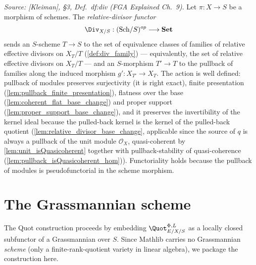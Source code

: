 \begin{definition}
  \label{def:div_functor}
  \textit{Source: [Kleiman], \S 3, Def.~df:div (FGA Explained Ch.~9).}
  Let \(\pi : X \to S\) be a morphism of schemes.  The
  \emph{relative-divisor functor}
  \[
    \Div_{X/S} : (\mathrm{Sch}/S)^{op} \longrightarrow \mathbf{Set}
  \]
  sends an \(S\)-scheme \(T \to S\) to the set of equivalence classes of
  families of relative effective divisors on \(X_T/T\)
  (\cref{def:div_family}) --- equivalently, the set of relative effective
  divisors on \(X_T/T\) --- and an \(S\)-morphism \(T' \to T\) to the
  pullback of families along the induced morphism
  \(g' : X_{T'} \to X_T\).  The action is well defined: pullback of modules
  preserves surjectivity (it is right exact), finite presentation
  (\cref{lem:pullback_finite_presentation}), flatness over the base
  (\cref{lem:coherent_flat_base_change}) and proper support
  (\cref{lem:proper_support_base_change}), and it preserves the
  invertibility of the kernel ideal because the pulled-back kernel is the
  kernel of the pulled-back quotient (\cref{lem:relative_divisor_base_change},
  applicable since the source of \(q\) is always a pullback of the unit
  module \(\mathcal O_X\), quasi-coherent by \cref{lem:unit_isQuasicoherent}
  together with pullback-stability of quasi-coherence
  (\cref{lem:pullback_isQuasicoherent_hom})).  Functoriality holds because
  the pullback of modules is pseudofunctorial in the scheme morphism.
\end{definition}

\section{The Grassmannian scheme}
\label{sec:grassmannian_scheme}

The Quot construction proceeds by embedding \(\Quot^{\Phi,L}_{E/X/S}\) as a
locally closed subfunctor of a Grassmannian over \(S\). Since Mathlib carries
no Grassmannian \emph{scheme} (only a finite-rank-quotient variety in
linear algebra), we package the construction here.


